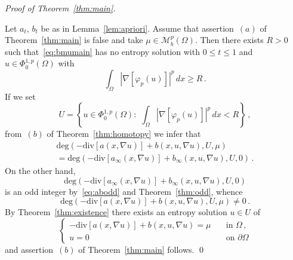 \documentclass[twoside,reqno]{amsart}
\numberwithin{equation}{section}
\theoremstyle{definition}
\begin{document}
%
\noindent
\emph{Proof of Theorem~\ref{thm:main}.}
\par\noindent
Let $a_t$, $b_t$ be as in Lemma~\ref{lem:apriori}.
Assume that assertion~$(a)$ of Theorem~\ref{thm:main} is false 
and take $\mu\in\mathcal{M}_b^p(\Omega)$.
Then there exists $R>0$ such that~\eqref{eq:bmumain}
has no entropy solution with $0\leq t\leq 1$ and
$u\in\Phi^{1,p}_0(\Omega)$ with
\[
\int_\Omega |\nabla[\varphi_p(u)]|^p\,dx \geq R\,.
\]
If we set
\[
U = \left\{u\in\Phi^{1,p}_0(\Omega):\,\,
\int_\Omega |\nabla[\varphi_p(u)]|^p\,dx
< R\right\}\,,
\]
from~$(b)$ of Theorem~\ref{thm:homotopy} we infer that
\begin{multline*}
\mathrm{deg}(- \mathrm{div}[a(x,\nabla u)]
+ b(x,u,\nabla u),U,\mu) \\
= \mathrm{deg}(- \mathrm{div}[a_\infty(x,\nabla u)]
+ b_\infty(x,u,\nabla u),U,0)\,.
\end{multline*}
On the other hand, 
\[
\mathrm{deg}(- \mathrm{div}[a_\infty(x,\nabla u)]
+ b_\infty(x,u,\nabla u),U,0)
\]
is an odd integer by~\eqref{eq:abodd} and 
Theorem~\ref{thm:odd}, whence
\[
\mathrm{deg}(- \mathrm{div}[a(x,\nabla u)]
+ b(x,u,\nabla u),U,\mu) \neq 0\,.
\]
By Theorem~\ref{thm:existence} there exists an
entropy solution $u\in U$ of 
\[
\begin{cases}
- \mathrm{div}[a(x,\nabla u)] + b(x,u,\nabla u)=\mu
&\quad\text{in $\Omega$}\,,\\
u=0
&\quad\text{on $\partial\Omega$}
\end{cases}
\]
and assertion~$(b)$ of Theorem~\ref{thm:main} follows.
\qed


\end{document}
